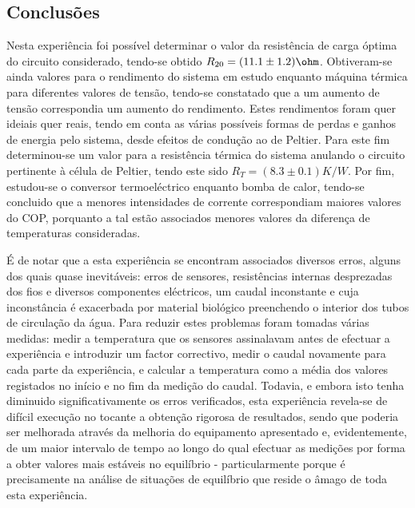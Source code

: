 \documentclass[9pt]{extarticle}
\begin{document}
\begin{multicols}{2}
\section{Conclusões}

\par Nesta experiência foi possível determinar o valor da resistência de carga óptima do circuito considerado, tendo-se obtido $R_{20}=(11.1\pm1.2)\ohm$. Obtiveram-se ainda valores para o rendimento do sistema em estudo enquanto máquina térmica para diferentes valores de tensão, tendo-se constatado que a um aumento de tensão correspondia um aumento do rendimento. Estes rendimentos foram quer ideiais quer reais, tendo em conta as várias possíveis formas de perdas e ganhos de energia pelo sistema, desde efeitos de condução ao de Peltier. Para este fim determinou-se um valor para a resistência térmica do sistema anulando o circuito pertinente à célula de Peltier, tendo este sido $R_T=(8.3\pm0.1)K/W$. Por fim, estudou-se o conversor termoeléctrico enquanto bomba de calor, tendo-se concluido que a menores intensidades de corrente correspondiam maiores valores do COP, porquanto a tal estão associados menores valores da diferença de temperaturas consideradas.

\par É de notar que a esta experiência se encontram associados diversos erros, alguns dos quais quase inevitáveis: erros de sensores, resistências internas desprezadas dos fios e diversos componentes eléctricos, um caudal inconstante e cuja inconstância é exacerbada por material biológico preenchendo o interior dos tubos de circulação da água. Para reduzir estes problemas foram tomadas várias medidas: medir a temperatura que os sensores assinalavam antes de efectuar a experiência e introduzir um factor correctivo, medir o caudal novamente para cada parte da experiência, e calcular a temperatura como a média dos valores registados no início e no fim da medição do caudal. Todavia, e embora isto tenha diminuido significativamente os erros verificados, esta experiência revela-se de difícil execução no tocante a obtenção rigorosa de resultados, sendo que poderia ser melhorada através da melhoria do equipamento apresentado e, evidentemente, de um maior intervalo de tempo ao longo do qual efectuar as medições por forma a obter valores mais estáveis no equilíbrio - particularmente porque é precisamente na análise de situações de equilíbrio que reside o âmago de toda esta experiência.


\begin{thebibliography}{9}


\end{thebibliography}
\end{multicols}
\end{document}
